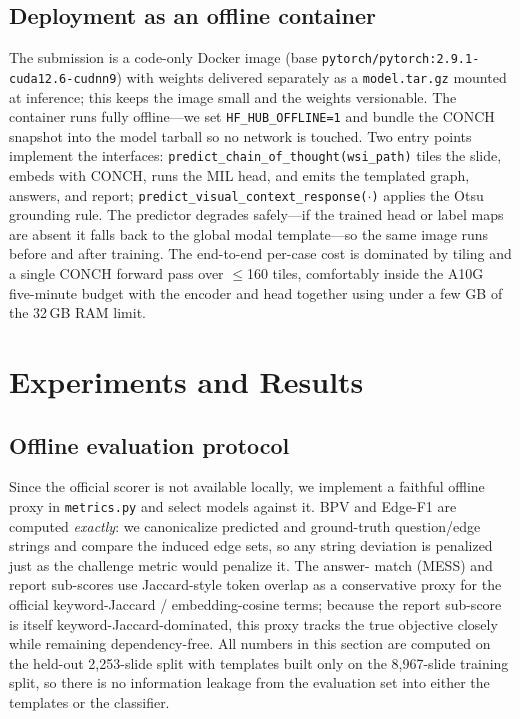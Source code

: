 \documentclass[11pt,a4paper]{article}
\newcommand{\code}[1]{\texttt{\small #1}}
\begin{document}
\subsection{Deployment as an offline container}
\label{sec:deploy}
The submission is a code-only Docker image (base \code{pytorch/pytorch:2.9.1-cuda12.6-cudnn9})
with weights delivered separately as a \code{model.tar.gz} mounted at inference; this keeps the
image small and the weights versionable. The container runs fully offline---we set
\code{HF\_HUB\_OFFLINE=1} and bundle the CONCH snapshot into the model tarball so no network is
touched. Two entry points implement the interfaces: \code{predict\_chain\_of\_thought(wsi\_path)}
tiles the slide, embeds with CONCH, runs the MIL head, and emits the templated graph, answers,
and report; \code{predict\_visual\_context\_response($\cdot$)} applies the Otsu grounding rule.
The predictor degrades safely---if the trained head or label maps are absent it falls back to the
global modal template---so the same image runs before and after training. The end-to-end per-case
cost is dominated by tiling and a single CONCH forward pass over $\le$160 tiles, comfortably
inside the A10G five-minute budget with the encoder and head together using under a few GB of the
32\,GB RAM limit.

\section{Experiments and Results}
\label{sec:results}

\subsection{Offline evaluation protocol}
Since the official scorer is not available locally, we implement a faithful offline proxy in
\code{metrics.py} and select models against it. BPV and Edge-F1 are computed \emph{exactly}: we
canonicalize predicted and ground-truth question/edge strings and compare the induced edge sets,
so any string deviation is penalized just as the challenge metric would penalize it. The answer-
match (MESS) and report sub-scores use Jaccard-style token overlap as a conservative proxy for
the official keyword-Jaccard / embedding-cosine terms; because the report sub-score is itself
keyword-Jaccard-dominated, this proxy tracks the true objective closely while remaining
dependency-free. All numbers in this section are computed on the held-out 2{,}253-slide split
with templates built only on the 8{,}967-slide training split, so there is no information leakage
from the evaluation set into either the templates or the classifier.
\end{document}
